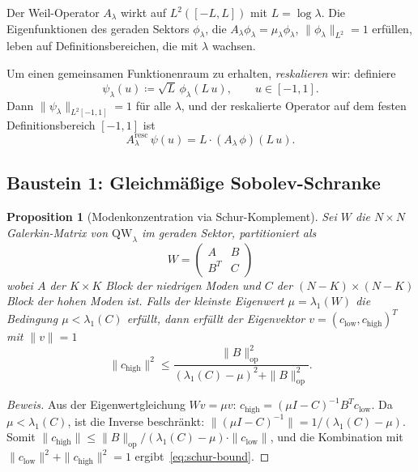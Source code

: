 ﻿\documentclass[12pt,a4paper]{article}
\newtheorem{proposition}[theorem]{Proposition}
\theoremstyle{definition}
\theoremstyle{remark}
\begin{document}
Der Weil-Operator $A_\lambda$ wirkt auf $L^2([-L, L])$ mit $L = \log\lambda$. Die Eigenfunktionen des geraden Sektors $\phi_\lambda$, die $A_\lambda \phi_\lambda = \mu_\lambda \phi_\lambda$, $\|\phi_\lambda\|_{L^2} = 1$ erfüllen, leben auf Definitionsbereichen, die mit $\lambda$ wachsen.

Um einen gemeinsamen Funktionenraum zu erhalten, \emph{reskalieren} wir: definiere
\begin{equation}
\label{eq:rescaled}
\psi_\lambda(u) \coloneqq \sqrt{L}\,\phi_\lambda(L\,u), \qquad u \in [-1,1].
\end{equation}
Dann $\|\psi_\lambda\|_{L^2[-1,1]} = 1$ für alle $\lambda$, und der reskalierte Operator auf dem festen Definitionsbereich $[-1,1]$ ist
\[
  A_\lambda^{\mathrm{resc}}\,\psi(u) = L \cdot (A_\lambda\,\phi)(L\,u).
\]

\subsection{Baustein 1: Gleichm\"a\ss ige Sobolev-Schranke}

\begin{proposition}[Modenkonzentration via Schur-Komplement]
\label{prop:mode-concentration}
Sei $W$ die $N \times N$ Galerkin-Matrix von $\mathrm{QW}_\lambda$ im geraden Sektor, partitioniert als
\[
  W = \begin{pmatrix} A & B \\ B^T & C \end{pmatrix}
\]
wobei $A$ der $K \times K$ Block der niedrigen Moden und $C$ der $(N-K) \times (N-K)$ Block der hohen Moden ist. Falls der kleinste Eigenwert $\mu = \lambda_1(W)$ die Bedingung $\mu < \lambda_1(C)$ erfüllt, dann erfüllt der Eigenvektor $v = (c_{\mathrm{low}}, c_{\mathrm{high}})^T$ mit $\|v\| = 1$
\begin{equation}
\label{eq:schur-bound}
  \|c_{\mathrm{high}}\|^2 \leq \frac{\|B\|_{\mathrm{op}}^2}{(\lambda_1(C) - \mu)^2 + \|B\|_{\mathrm{op}}^2}.
\end{equation}
\end{proposition}

\begin{proof}[Beweis]
Aus der Eigenwertgleichung $Wv = \mu v$:
$c_{\mathrm{high}} = (\mu I - C)^{-1} B^T c_{\mathrm{low}}$.
Da $\mu < \lambda_1(C)$, ist die Inverse beschränkt: $\|(\mu I - C)^{-1}\| = 1/(\lambda_1(C) - \mu)$.
Somit $\|c_{\mathrm{high}}\| \leq \|B\|_{\mathrm{op}} / (\lambda_1(C) - \mu) \cdot \|c_{\mathrm{low}}\|$,
und die Kombination mit $\|c_{\mathrm{low}}\|^2 + \|c_{\mathrm{high}}\|^2 = 1$ ergibt~\eqref{eq:schur-bound}.
\end{proof}
\end{document}
